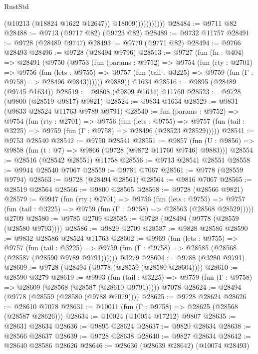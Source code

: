 \begin{lexlean}{RustStd}
\begin{coremodule}
{\begin{coremodule}
{{{{{{{{{{{{{{{{{{{{{{{{{{                          (@10213 (@18824 @1622 @12647))
                          @18009)))))))))))
@28484 := @9711 @82
@28488 := @9713 (@9717 @82) (@9723 @82)
@28489 := @9732 @11757
@28491 := @9728 (@28489 @9747)
@28493 := @9770 (@9771 @82)
@28494 := @9766 @28493
@28496 := @9728 (@28494 @9796)
@28513 := @9727
    (fun (fn : @404) =>
    @28491
      (@9750
        (@9753
          (fun (params : @9752) =>
          @9754
            (fun (rty : @2701) =>
            @9756
              (fun (lets : @9755) =>
              @9757 (fun (tail : @3225) => @9759 (fun (Γ : @9758) => @28496 @9843))))))
        @9889))
    @1634
@28516 := @9895 (@28489 (@9745 @1634))
@28519 := @9808 (@9809 @1634) @11760
@28523 := @9728 (@9800 (@28519 @9817) @9821)
@28524 := @9834 @1634
@28529 := @9831 (@9833 @28524 @11763 @9789 @9791)
@28540 := fun (params : @9752) =>
  @9754
    (fun (rty : @2701) =>
    @9756
      (fun (lets : @9755) =>
      @9757 (fun (tail : @3225) => @9759 (fun (Γ : @9758) => @28496 (@28523 @28529)))))
@28541 := @9753 @28540
@28542 := @9750 @28541
@28551 := @9857
    (fun (U : @9856) => @9858 (fun (t : @7) => @9866 (@9728 (@9872 @11760 @9746) @9883)))
@28554 := @28516 (@28542 @28551) @11758
@28556 := @9713 @28541 @28551
@28558 := @9944 @28540 @7067
@28559 := @9781 @7067
@28561 := @9778 (@28559 @9794)
@28563 := @9728 (@28494 @28561)
@28564 := @9816 @7067
@28565 := @28519 @28564
@28566 := @9800 @28565
@28568 := @9728 (@28566 @9821)
@28579 := @9947
    (fun (rty : @2701) =>
    @9756
      (fun (lets : @9755) =>
      @9757 (fun (tail : @3225) => @9759 (fun (Γ : @9758) => @28563 (@28568 @28529)))))
    @2709
@28580 := @9785 @2709
@28585 := @9728 (@28494 (@9778 (@28559 (@28580 @9793))))
@28586 := @9829 @2709
@28587 := @9828 @28586
@28590 := @9832 @28586 @28524 @11763
@28602 := @9969
    (fun (lets : @9755) =>
    @9757
      (fun (tail : @3225) =>
      @9759 (fun (Γ : @9758) => @28585 (@28568 (@28587 (@28590 @9789 @9791))))))
    @3279
@28604 := @9788 (@3280 @9791)
@28609 := @9728 (@28494 (@9778 (@28559 (@28580 @28604))))
@28610 := @28590 @3279
@28619 := @9993
    (fun (tail : @3225) => @9759 (fun (Γ : @9758) => @28609 (@28568 (@28587 (@28610 @9791)))))
    @7078
@28624 := @28494 (@9778 (@28559 (@28580 (@9788 @7079))))
@28625 := @9728 @28624
@28626 := @28610 @7078
@28631 := @10011 (fun (Γ : @9758) => @28625 (@28568 (@28587 @28626)))
@28634 := @10024 (@10054 @17212) @9807
@28635 := @28631 @28634
@28636 := @9895 @28624
@28637 := @9820 @28634
@28638 := @28566 @28637
@28639 := @9728 @28638
@28640 := @9827 @28634
@28642 := @28640 @28586 @28626
@28646 := @28636 (@28639 @28642) (@10074 @28493)
}}}}}}}}}}}}}}}}}}}}}}}}}}
\end{coremodule}}
\end{coremodule}
\end{lexlean}
